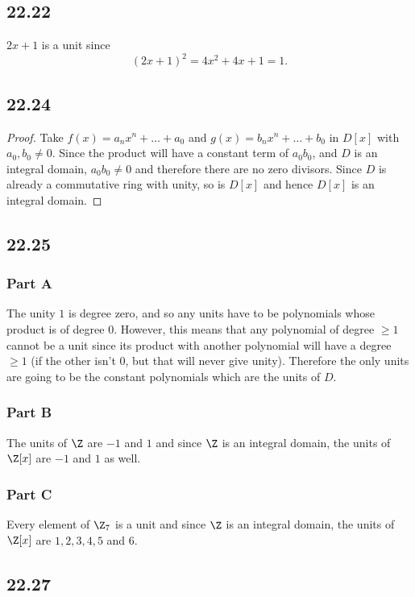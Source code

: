 \documentclass[12pt,titlepage]{extarticle}
\begin{document}
\subsection*{22.22}
$2x + 1$ is a unit since
\[
    (2x + 1)^2 = 4x^2 + 4x + 1 = 1
.\]

\subsection*{22.24}
\begin{proof}
    Take $f(x) = a_n x^n + \ldots + a_0$ and $g(x) = b_n x^n + \ldots + b_0$ in $D[x]$ with $a_0, b_0 \neq 0$. Since the product will have a constant term of $a_0 b_0$, and $D$ is an integral domain, $a_0 b_0 \neq 0$ and therefore there are no zero divisors. Since $D$ is already a commutative ring with unity, so is $D[x]$ and hence $D[x]$ is an integral domain.
\end{proof}

\subsection*{22.25}
\subsubsection*{Part A}
The unity $1$ is degree zero, and so any units have to be polynomials whose product is of degree $0$. However, this means that any polynomial of degree $\geq 1$ cannot be a unit since its product with another polynomial will have a degree $\geq 1$ (if the other isn't $0$, but that will never give unity). Therefore the only units are going to be the constant polynomials which are the units of $D$.

\subsubsection*{Part B}
The units of $\Z$ are $-1$ and $1$ and since $\Z$ is an integral domain, the units of $\Z[x]$ are $-1$ and $1$ as well.

\subsubsection*{Part C}
Every element of $\Z_7$ is a unit and since $\Z$ is an integral domain, the units of $\Z[x]$ are $1,2,3,4,5$ and $6$.

\subsection*{22.27}
\end{document}
